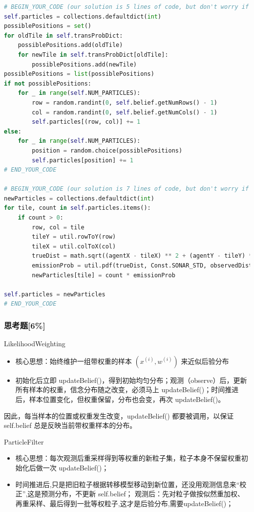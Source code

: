 \documentclass{article}
\begin{document}
\begin{lstlisting}[language=Python]
# BEGIN_YOUR_CODE (our solution is 5 lines of code, but don't worry if you deviate from this)
self.particles = collections.defaultdict(int)
possiblePositions = set()
for oldTile in self.transProbDict:
	possiblePositions.add(oldTile)
	for newTile in self.transProbDict[oldTile]:
		possiblePositions.add(newTile)
possiblePositions = list(possiblePositions)
if not possiblePositions:
	for _ in range(self.NUM_PARTICLES):
		row = random.randint(0, self.belief.getNumRows() - 1)
		col = random.randint(0, self.belief.getNumCols() - 1)
		self.particles[(row, col)] += 1
else:
	for _ in range(self.NUM_PARTICLES):
		position = random.choice(possiblePositions)
		self.particles[position] += 1
# END_YOUR_CODE

# BEGIN_YOUR_CODE (our solution is 7 lines of code, but don't worry if you deviate from this)
newParticles = collections.defaultdict(int)
for tile, count in self.particles.items():
	if count > 0:  
		row, col = tile
		tileY = util.rowToY(row)
		tileX = util.colToX(col)
		trueDist = math.sqrt((agentX - tileX) ** 2 + (agentY - tileY) ** 2)
		emissionProb = util.pdf(trueDist, Const.SONAR_STD, observedDist)
		newParticles[tile] = count * emissionProb

self.particles = newParticles
# END_YOUR_CODE
\end{lstlisting}

\subsubsection{思考题[6\%]}
LikelihoodWeighting
\begin{itemize}
	\item 核心思想：始终维护一组带权重的样本 ${(x^{(i)}, w^{(i)})}$ 来近似后验分布
	\item 初始化后立即 updateBelief()，得到初始均匀分布；观测（observe）后，更新所有样本的权重，信念分布随之改变，必须马上 updateBelief()；时间推进后，样本位置变化，但权重保留，分布也会变，再次 updateBelief()。
\end{itemize}

因此，每当样本的位置或权重发生改变，updateBelief() 都要被调用，以保证 self.belief 总是反映当前带权重样本的分布。

ParticleFilter
\begin{itemize}
	\item 核心思想：每次观测后重采样得到等权重的新粒子集，粒子本身不保留权重初始化后做一次 updateBelief()；
	\item 时间推进后,只是把旧粒子根据转移模型移动到新位置，还没用观测信息来“校正”,这是预测分布，不更新 self.belief；
	观测后：先对粒子做按似然重加权、再重采样、最后得到一批等权粒子,这才是后验分布,需要updateBelief()；
\end{itemize}
\end{document}
